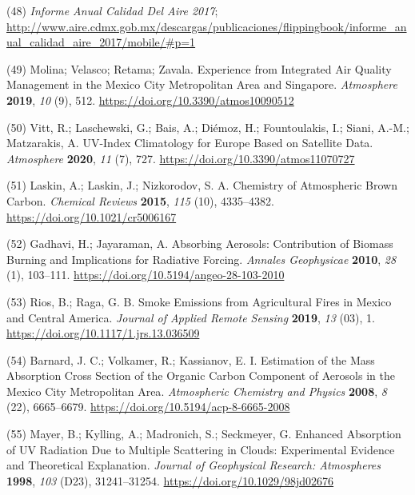 \documentclass[10pt]{article}
\begin{document}
\label{csl:48}(48) \textit{{Informe Anual Calidad Del Aire 2017}}; \url{http://www.aire.cdmx.gob.mx/descargas/publicaciones/flippingbook/informe_anual_calidad_aire_2017/mobile/#p=1}

\label{csl:49}(49) Molina; Velasco; Retama; Zavala. {Experience from Integrated Air Quality Management in the Mexico City Metropolitan Area and Singapore}. \textit{Atmosphere} \textbf{2019}, \textit{10} (9), 512. \url{https://doi.org/10.3390/atmos10090512}

\label{csl:50}(50) Vitt, R.; Laschewski, G.; Bais, A.; Di{\'{e}}moz, H.; Fountoulakis, I.; Siani, A.-M.; Matzarakis, A. {{UV}-Index Climatology for Europe Based on Satellite Data}. \textit{Atmosphere} \textbf{2020}, \textit{11} (7), 727. \url{https://doi.org/10.3390/atmos11070727}

\label{csl:51}(51) Laskin, A.; Laskin, J.; Nizkorodov, S. A. {Chemistry of Atmospheric Brown Carbon}. \textit{Chemical Reviews} \textbf{2015}, \textit{115} (10), 4335–4382. \url{https://doi.org/10.1021/cr5006167}

\label{csl:52}(52) Gadhavi, H.; Jayaraman, A. {Absorbing Aerosols: Contribution of Biomass Burning and Implications for Radiative Forcing}. \textit{Annales Geophysicae} \textbf{2010}, \textit{28} (1), 103–111. \url{https://doi.org/10.5194/angeo-28-103-2010}

\label{csl:53}(53) Rios, B.; Raga, G. B. {Smoke Emissions from Agricultural Fires in Mexico and Central America}. \textit{Journal of Applied Remote Sensing} \textbf{2019}, \textit{13} (03), 1. \url{https://doi.org/10.1117/1.jrs.13.036509}

\label{csl:54}(54) Barnard, J. C.; Volkamer, R.; Kassianov, E. I. {Estimation of the Mass Absorption Cross Section of the Organic Carbon Component of Aerosols in the Mexico City Metropolitan Area}. \textit{Atmospheric Chemistry and Physics} \textbf{2008}, \textit{8} (22), 6665–6679. \url{https://doi.org/10.5194/acp-8-6665-2008}

\label{csl:55}(55) Mayer, B.; Kylling, A.; Madronich, S.; Seckmeyer, G. {Enhanced Absorption of {UV} Radiation Due to Multiple Scattering in Clouds: Experimental Evidence and Theoretical Explanation}. \textit{Journal of Geophysical Research: Atmospheres} \textbf{1998}, \textit{103} (D23), 31241–31254. \url{https://doi.org/10.1029/98jd02676}
\end{document}
